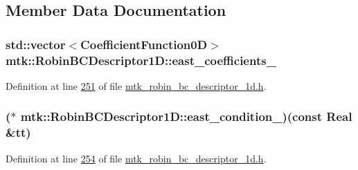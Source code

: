 \subsection{Member Data Documentation}
\hypertarget{classmtk_1_1RobinBCDescriptor1D_aa8f5350e1767174f92fda449b44d1b04}{
\subsubsection[{east\+\_\+coefficients\+\_\+}]{\setlength{\rightskip}{0pt plus 5cm}std\+::vector$<${\bf Coefficient\+Function0\+D}$>$ mtk\+::\+Robin\+B\+C\+Descriptor1\+D\+::east\+\_\+coefficients\+\_\+\hspace{0.3cm}{\ttfamily [private]}}}\label{classmtk_1_1RobinBCDescriptor1D_aa8f5350e1767174f92fda449b44d1b04}


Definition at line \hyperlink{mtk__robin__bc__descriptor__1d_8h_source_l00251}{251} of file \hyperlink{mtk__robin__bc__descriptor__1d_8h_source}{mtk\+\_\+robin\+\_\+bc\+\_\+descriptor\+\_\+1d.\+h}.

\hypertarget{classmtk_1_1RobinBCDescriptor1D_adecf9da4390869d2aa49ccb1307320d6}{
\subsubsection[{east\+\_\+condition\+\_\+}]{($\ast$ mtk\+::\+Robin\+B\+C\+Descriptor1\+D\+::east\+\_\+condition\+\_\+)(const {\bf Real} \&tt)\hspace{0.3cm}{\ttfamily [private]}}}\label{classmtk_1_1RobinBCDescriptor1D_adecf9da4390869d2aa49ccb1307320d6}


Definition at line \hyperlink{mtk__robin__bc__descriptor__1d_8h_source_l00254}{254} of file \hyperlink{mtk__robin__bc__descriptor__1d_8h_source}{mtk\+\_\+robin\+\_\+bc\+\_\+descriptor\+\_\+1d.\+h}.

